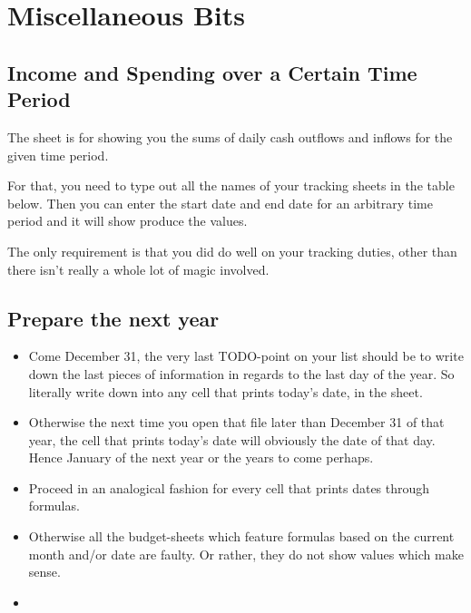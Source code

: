 \section{Miscellaneous Bits}
\label{sec:miscellaneous-bits}

\subsection{Income and Spending over a Certain Time Period}
\label{subsec:income-and-spending-certain-time-period}

The sheet  is for showing you the sums of daily cash outflows and inflows for the given time period.

For that, you need to type out all the names of your tracking sheets in the table below.
Then you can enter the start date and end date for an arbitrary time period and it will show produce the values.

The only requirement is that you did do well on your tracking duties, other than there isn't really a whole lot of magic involved.

\subsection{Prepare the next year}
\label{subsec:prepare-the-next-year}

\begin{itemize}
	\item Come December 31, the very last TODO-point on your list should be to write down the last pieces of information in regards to the last day of the year.
	So literally write down  into any cell that prints today's date, \eg in the  sheet.
	\item Otherwise the next time you open that file later than December 31 of that year, the cell that prints today's date will obviously the date of that day.
	Hence January of the next year or the years to come perhaps.
	\item Proceed in an analogical fashion for every cell that prints dates through formulas.
	\item Otherwise all the budget-sheets which feature formulas based on the current month and/or date are faulty.
	Or rather, they do not show values which make sense.
	\item 
\end{itemize}

